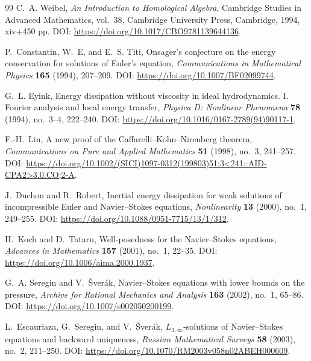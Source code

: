\documentclass[11pt]{article}
\numberwithin{equation}{section}
\begin{document}
\begin{thebibliography}{99}
C.~A. Weibel,
\newblock \emph{An Introduction to Homological Algebra},
\newblock Cambridge Studies in Advanced Mathematics, vol.~38, Cambridge University Press, Cambridge, 1994, xiv+450 pp.
\newblock DOI: \url{https://doi.org/10.1017/CBO9781139644136}.

P.~Constantin, W.~{E}, and E.~S. Titi,
\newblock Onsager's conjecture on the energy conservation for solutions of Euler's equation,
\newblock \emph{Communications in Mathematical Physics} \textbf{165} (1994), 207--209.
\newblock DOI: \url{https://doi.org/10.1007/BF02099744}.

G.~L. Eyink,
\newblock Energy dissipation without viscosity in ideal hydrodynamics. I. Fourier analysis and local energy transfer,
\newblock \emph{Physica D: Nonlinear Phenomena} \textbf{78} (1994), no.~3--4, 222--240.
\newblock DOI: \url{https://doi.org/10.1016/0167-2789(94)90117-1}.

F.-H.~Lin,
\newblock A new proof of the Caffarelli--Kohn--Nirenberg theorem,
\newblock \emph{Communications on Pure and Applied Mathematics} \textbf{51} (1998), no.~3, 241--257.
\newblock DOI: \url{https://doi.org/10.1002/(SICI)1097-0312(199803)51:3<241::AID-CPA2>3.0.CO;2-A}.

J.~Duchon and R.~Robert,
\newblock Inertial energy dissipation for weak solutions of incompressible Euler and Navier--Stokes equations,
\newblock \emph{Nonlinearity} \textbf{13} (2000), no.~1, 249--255.
\newblock DOI: \url{https://doi.org/10.1088/0951-7715/13/1/312}.

H.~Koch and D.~Tataru,
\newblock Well-posedness for the Navier--Stokes equations,
\newblock \emph{Advances in Mathematics} \textbf{157} (2001), no.~1, 22--35.
\newblock DOI: \url{https://doi.org/10.1006/aima.2000.1937}.

G.~A. Seregin and V.~\v{S}ver\'ak,
\newblock Navier--Stokes equations with lower bounds on the pressure,
\newblock \emph{Archive for Rational Mechanics and Analysis} \textbf{163} (2002), no.~1, 65--86.
\newblock DOI: \url{https://doi.org/10.1007/s002050200199}.

L.~Escauriaza, G.~Seregin, and V.~\v{S}ver\'ak,
\newblock \(L_{3,\infty}\)-solutions of Navier--Stokes equations and backward uniqueness,
\newblock \emph{Russian Mathematical Surveys} \textbf{58} (2003), no.~2, 211--250.
\newblock DOI: \url{https://doi.org/10.1070/RM2003v058n02ABEH000609}.


\end{thebibliography}
\end{document}
